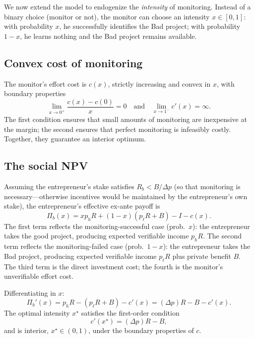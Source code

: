 \documentclass[11pt,a4paper,oneside]{book}
\def\et{\quad \text{and} \quad}
\theoremstyle{plain}
\theoremstyle{definition}
\theoremstyle{remark}
\numberwithin{equation}{chapter}
\begin{document}
We now extend the model to endogenize the \emph{intensity} of monitoring.
Instead of a binary choice (monitor or not), the monitor can choose an intensity $x \in [0, 1]$: with probability $x$, he successfully identifies the Bad project; with probability $1 - x$, he learns nothing and the Bad project remains available.

\subsection{Convex cost of monitoring}

The monitor's effort cost is $c(x)$, strictly increasing and convex in $x$, with boundary properties
\begin{equation}\label{eq:mon-boundary}
  \lim_{x \to 0^+} \frac{c(x) - c(0)}{x} = 0
  \et
  \lim_{x \to 1^-} c'(x) = \infty.
\end{equation}
The first condition ensures that small amounts of monitoring are inexpensive at the margin; the second ensures that perfect monitoring is infeasibly costly.
Together, they guarantee an interior optimum.

\subsection{The social NPV}

Assuming the entrepreneur's stake satisfies $R_b < B/\Delta p$ (so that monitoring is necessary---otherwise incentives would be maintained by the entrepreneur's own stake), the entrepreneur's effective ex-ante payoff is
\begin{equation}\label{eq:mon-NPV-variable}
  \Pi_b(x) = x p_h R + (1 - x)(p_\ell R + B) - I - c(x).
\end{equation}
The first term reflects the monitoring-successful case (prob.\ $x$): the entrepreneur takes the good project, producing expected verifiable income $p_h R$.
The second term reflects the monitoring-failed case (prob.\ $1 - x$): the entrepreneur takes the Bad project, producing expected verifiable income $p_\ell R$ plus private benefit $B$.
The third term is the direct investment cost; the fourth is the monitor's unverifiable effort cost.

Differentiating in $x$:
\begin{equation}\label{eq:mon-FOC}
  \Pi_b'(x) = p_h R - (p_\ell R + B) - c'(x) = (\Delta p) R - B - c'(x).
\end{equation}
The optimal intensity $x^\star$ satisfies the first-order condition
\begin{equation}\label{eq:mon-FOC-star}
  c'(x^\star) = (\Delta p) R - B,
\end{equation}
and is interior, $x^\star \in (0, 1)$, under the boundary properties of $c$.
\end{document}
